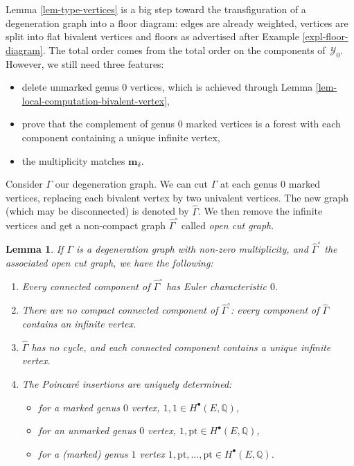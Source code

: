 \documentclass[pdftex]{sigma}
\newcommand{\pt}{\mathrm{pt}}
\newcommand{\QQ}{\mathbb{Q}}
\newcommand{\bfm}{ {\boldsymbol m} }
\newcommand{\Y}{\mathcal{Y}}
\numberwithin{equation}{section}
\newtheorem{lem}[theo]{Lemma}
\theoremstyle{definition}
\begin{document}
Lemma \ref{lem-type-vertices} is a big step toward the transfiguration of a degeneration graph into a floor diagram: edges are already weighted, vertices are split into flat bivalent vertices and floors as advertised after Example \ref{expl-floor-diagram}. The total order comes from the total order on the components of~$\Y_0$. However, we still need three features:
 \begin{itemize}\itemsep=0pt
 \item delete unmarked genus $0$ vertices, which is achieved through Lemma \ref{lem-local-computation-bivalent-vertex},
 \item prove that the complement of genus $0$ marked vertices is a forest with each component containing a unique infinite vertex,
 \item the multiplicity matches $\bfm_\delta$.
 \end{itemize}
Consider $\Gamma$ our degeneration graph. We can cut $\Gamma$ at each genus $0$ marked vertices, replacing each bivalent vertex by two univalent vertices. The new graph (which may be disconnected) is denoted by $\widehat{\Gamma}$. We then remove the infinite vertices and get a non-compact graph $\widehat{\Gamma}^\circ$ called \textit{open cut graph}.

\begin{lem}\label{lem-complement-tree}
 If $\Gamma$ is a degeneration graph with non-zero multiplicity, and $\widehat{\Gamma}^\circ$ the associated open cut graph, we have the following:
 \begin{enumerate}\itemsep=0pt
 \item[$(1)$] Every connected component of $\widehat{\Gamma}^\circ$ has Euler characteristic $0$.
 \item[$(2)$] There are no compact connected component of $\widehat{\Gamma}^\circ$: every component of $\widehat{\Gamma}$ contains an infinite vertex.
 \item[$(3)$] $\widehat{\Gamma}$ has no cycle, and each connected component contains a unique infinite vertex.
 \item[$(4)$] The Poincar\'e insertions are uniquely determined:
 \begin{itemize}\itemsep=0pt
 \item for a marked genus $0$ vertex, $1,1\in H^\bullet(E,\QQ)$,
 \item for an unmarked genus $0$ vertex, $1,\pt\in H^\bullet(E,\QQ)$,
 \item for a (marked) genus $1$ vertex $1,\pt,\dots,\pt\in H^\bullet(E,\QQ)$.
 \end{itemize}
 \end{enumerate}
\end{lem}
\end{document}
